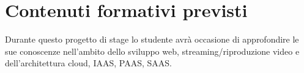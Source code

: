 \section*{Contenuti formativi previsti}
Durante questo progetto di stage lo studente avrà occasione di approfondire le sue conoscenze 
nell'ambito dello sviluppo web, streaming/riproduzione video e dell'architettura cloud, IAAS, PAAS, SAAS.
\newpage